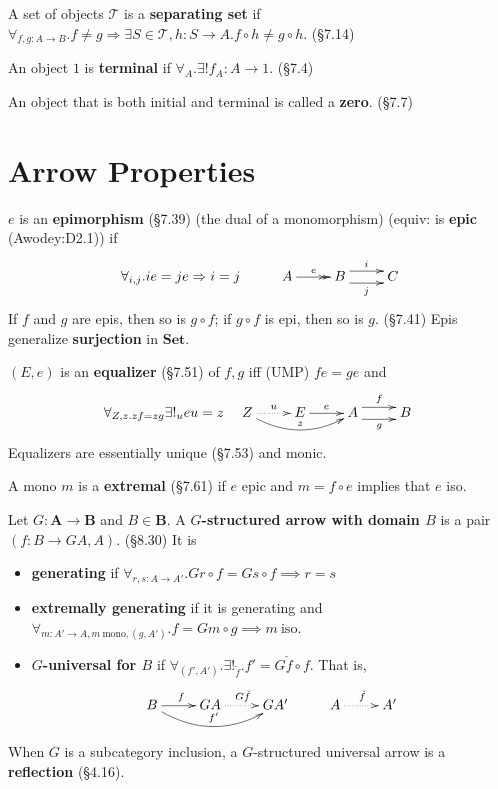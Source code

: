 \documentclass[10pt,twocolumn,letterpaper]{article}
\newcommand{\defn}[1]{{\bf #1}}
\begin{document}
  A set of objects $\mathcal{T}$ is a \defn{separating set} if
  $\forall_{f,g : A \to B} . f \ne g \Rightarrow \exists{S \in \mathcal{T},
  h : S \to A} . f \circ h \ne g \circ h$. (\S7.14)

  An object $1$ is \defn{terminal} if $\forall_A . \exists! f_A : A \to 1$.
  (\S7.4)

  An object that is both initial and terminal is called a \defn{zero}.
  (\S7.7)

\section{Arrow Properties}

  $e$ is an \defn{epimorphism} (\S7.39) (the dual of a monomorphism)
  (equiv: is \defn{epic} (Awodey:D2.1)) if
    \[\xymatrix{\forall_{i,j} . ie = je \Rightarrow i = j & A \ar@{->>}[r]^e & B \ar@<1ex>[r]^{i} \ar@<-1ex>[r]_j & C} \]
  If $f$ and $g$ are epis, then so is $g \circ f$; if $g \circ f$ is epi,
  then so is $g$. (\S7.41)  Epis generalize \defn{surjection} in
  $\mathbf{Set}$.

  $(E,e)$ is an \defn{equalizer} (\S7.51) of $f,g$ iff (UMP) $fe = ge$ and
     \[\forall_{Z,z . zf = zg} \exists!_u eu = z \quad
     \xymatrix{
     Z \ar@{..>}[r]^u \ar@/_1pc/[rr]^{z} & E \ar[r]^e & A \ar@<1ex>[r]^f \ar@<-1ex>[r]_g & B \\
     }\]
  Equalizers are essentially unique (\S7.53) and monic. %

  A mono $m$ is a \defn{extremal} (\S7.61) if $e$ epic and
  $m = f \circ e$ implies that $e$ iso.

  Let $G: \mathbf{A} \to \mathbf{B}$ and $B \in \mathbf{B}$.  A
  \defn{$G$-structured arrow with domain $B$} is a pair $(f : B \to GA, A)$.
  (\S8.30)  It is
  \begin{itemize}
    \item \defn{generating} if $\forall_{r,s : A \to A'} . Gr \circ f = Gs
      \circ f \implies r = s$
    \item \defn{extremally generating} if it is generating and $\forall_{m :
      A' \to A, m ~\text{mono}, (g,A')} . f = Gm \circ g \implies m ~\text{iso}$.
    \item \defn{$G$-universal for $B$} if $\forall_{(f', A')} .
    \exists!_{\check f} . f' = G{\check f} \circ f$.  That is,
    \[\xymatrix{
        B \ar[r]^f \ar@/_1.25pc/[rr]^{f'}
        & GA \ar@{.>}[r]^{G{\check f}}
        & GA'
        & A \ar@{.>}[r]^{\check f}
        & A'
    }\]
  \end{itemize}
  When $G$ is a subcategory inclusion, a $G$-structured universal arrow is
  a \defn{reflection} (\S4.16).
\end{document}
